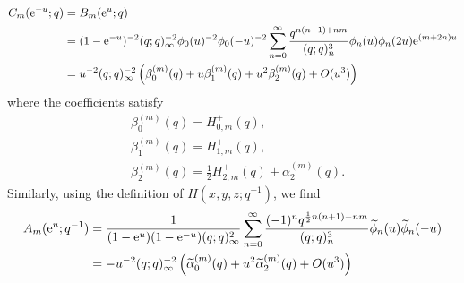 \documentclass[12pt,reqno]{amsart}
\theoremstyle{definition}
\def\wt{\widetilde}
\def\re{{\rm e}}
\def\cA{\mathcal{A}}
\newcommand{\nn}{\nonumber \\}
\begin{document}
\begin{align}
 C_m(\re^{-u};q)& = B_m(\re^u;q)\nn
  &= (1-\re^{-u})^{-2}(q;q)_\infty^{-2}
    \phi_0(u)^{-2}\phi_0(-u)^{-2}
    \sum_{n=0}^\infty
    \frac{q^{n(n+1)+nm}}{(q;q)_n^3}
    \phi_n(u)\phi_n(2u) \re^{(m+2n)u} \nn
  &= u^{-2}(q;q)_\infty^{-2}
    \left(\beta^{(m)}_0(q)+u\beta^{(m)}_1(q)
    +u^2\beta^{(m)}_2(q)+O(u^3)\right)
    \label{eq:B-uexp-52}
\end{align}
where the coefficients satisfy
\begin{align}
  &\beta^{(m)}_0(q) = H^{+}_{0,m}(q),
    \label{eq:b0-52}\\
  &\beta^{(m)}_1(q) = H^{+}_{1,m}(q),
    \label{eq:b1-52}\\
  &\beta^{(m)}_2(q) =
    \frac{1}{2}H^+_{2,m}(q)+\alpha^{(m)}_2(q).
    \label{eq:b2-52}
\end{align}
Similarly, using the definition of $H(x,y,z;q^{-1})$, we find
\begin{align}
  A_m(\re^u;q^{-1})
  &=
    \frac{1}{(1-\re^u)(1-\re^{-u})(q;q)_\infty^2}
    \sum_{n=0}^\infty\frac{(-1)^nq^{\frac{1}{2}n(n+1)-nm}}
    {(q;q)_n^3}
    \wt{\phi}_n(u) \wt{\phi}_n(-u) \nn
  &= -u^{-2}(q;q)_\infty^{-2}
    \left(\wt{\alpha}^{(m)}_0(q)+u^2
    \wt{\alpha}^{(m)}_2(q) + O(u^3)\right)
    \label{eq:tA-uexp-52}
\end{align}
\end{document}
